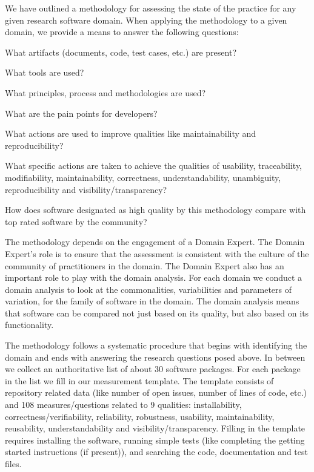 \documentclass[runningheads]{llncs}
\begin{document}
We have outlined a methodology for assessing the state of the practice for any
given research software domain.  When applying the methodology to a given domain, we provide a
means to answer the following questions:
\begin{inparaenum}[i)]
\item What artifacts (documents, code, test cases, etc.) are present?
\item What tools are used?
\item What principles, process and methodologies are used?
\item What are the pain points for developers?
\item What actions are used to improve qualities like maintainability and
reproducibility?
\item What specific actions are taken to achieve the qualities of usability,
traceability, modifiability, maintainability, correctness, understandability,
unambiguity, reproducibility and visibility/transparency?
\item How does software designated as high quality by this methodology compare
  with top rated software by the community?
\end{inparaenum} 

The methodology depends on the engagement of a Domain Expert.  The Domain
Expert's role is to ensure that the assessment is consistent with the culture of
the community of practitioners in the domain.  The Domain Expert also has an
important role to play with the domain analysis.  For each domain we 
conduct a domain analysis to look at the commonalities, variabilities and
parameters of variation, for the family of software in the domain.  The domain
analysis means that software can be compared not just based on its quality, but
also based on its functionality.

The methodology follows a systematic procedure that begins with identifying the
domain and ends with answering the research questions posed above.  In between
we collect an authoritative list of about 30 software packages.  For each
package in the list we fill in our measurement template.  The template consists
of repository related data (like number of open issues, number of lines of code,
etc.) and 108 measures/questions related to 9 qualities: installability,
correctness/verifiability, reliability, robustness, usability, maintainability,
reusability, understandability and visibility/transparency. Filling in the
template requires installing the software, running simple tests (like completing
the getting started instructions (if present)), and searching the code,
documentation and test files.
\end{document}
